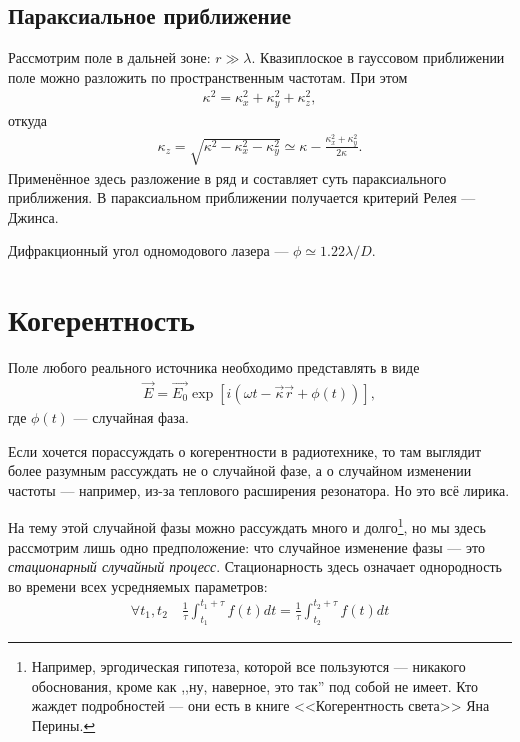 \subsection{Параксиальное приближение}
Рассмотрим поле в дальней зоне: \(r \gg \lambda\). Квазиплоское в гауссовом
приближении поле можно разложить по пространственным частотам. При этом
\begin{align*}
  \kappa^2 = \kappa^2_x + \kappa^2_y + \kappa^2_z,
\end{align*}
откуда
\begin{align*}
  \kappa_z = \sqrt{\kappa^2 - \kappa^2_x - \kappa^2_y} \simeq \kappa
  - \frac{\kappa_x^2 + \kappa_y^2}{2\kappa}.
\end{align*}
Применённое здесь разложение в ряд и составляет суть параксиального приближения.
В параксиальном приближении получается критерий Релея --- Джинса.
\begin{remark}
  Дифракционный угол одномодового лазера --- \(\phi \simeq 1.22\lambda/D\).
\end{remark}

\section{Когерентность}
Поле любого реального источника необходимо представлять в виде
\begin{align*}
  \vec{E} = \vec{E_0} \exp\left[i(\omega t - \vec{\kappa}\vec{r}
  + \phi(t))\right],
\end{align*}
где \(\phi(t)\) --- случайная фаза. 
\begin{remark}
  Если хочется порассуждать о когерентности в радиотехнике, то там выглядит
  более разумным рассуждать не о случайной фазе, а о случайном изменении частоты
  --- например, из-за теплового расширения резонатора. Но это всё лирика.
\end{remark}
На тему этой случайной фазы можно рассуждать много и долго\footnote{Например, эргодическая
гипотеза, которой все пользуются --- никакого обоснования, кроме как ,,ну,
наверное, это так'' под собой не имеет. Кто жаждет подробностей --- они есть
в книге <<Когерентность света>> Яна Перины.}, но мы здесь рассмотрим лишь одно
предположение: что случайное изменение фазы --- это \emph{стационарный случайный
процесс}. Стационарность здесь означает однородность во времени всех усредняемых
параметров:
\begin{align*}
  \forall t_1, t_2 \quad \frac{1}{\tau}\int_{t_1}^{t_1 + \tau} f(t)dt = 
  \frac{1}{\tau}\int_{t_2}^{t_2 + \tau} f(t)dt
\end{align*}

